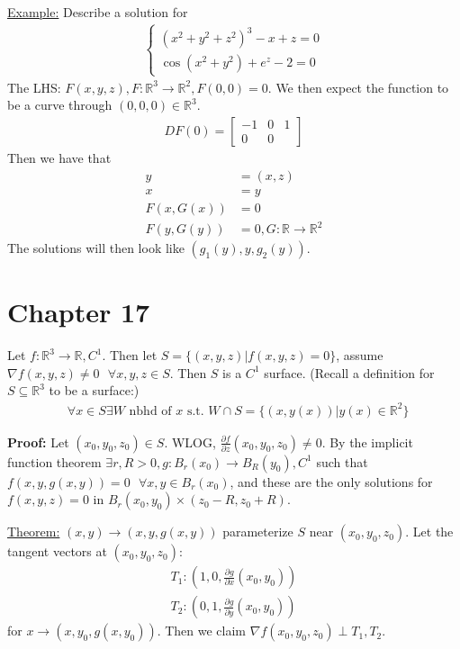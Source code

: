 \documentclass{article}
\newcommand*{\txt}[1]{\text{ #1 }}%
\newcommand*{\fora}{\txt{}\forall}%
\newcommand*{\rr}{\mathbb{R}}%
\newcommand*{\partials}[2]{\frac{\partial #1}{\partial #2}}%
\begin{document}
\underline{Example:} Describe a solution for \begin{align*}
    \begin{cases}
        (x^2+y^2+z^2)^3-x+z=0\\
        \cos(x^2+y^2)+e^z-2=0
    \end{cases}
\end{align*}The LHS: $F(x,y,z), F:\rr^3\to \rr^2, F(0,0)=0$. We then expect the function to be a curve through $(0,0,0)\in \rr^3$. \begin{align*}
    DF(0)=\begin{bmatrix}
        -1 & 0 & 1\\
        0 & 0 & 
    \end{bmatrix}
\end{align*}Then we have that \begin{align*}
    y&=(x,z)\\
    x&=y\\
    F(x,G(x))&=0\\
    F(y,G(y))&=0, G:\rr\to \rr^2
\end{align*}
The solutions will then look like $(g_1(y),y,g_2(y))$. 

\section{Chapter 17}

Let $f:\rr^3\to \rr, C^1$. Then let $S=\{(x,y,z)|f(x,y,z)=0\}$, assume $\nabla f(x,y,z)\neq 0 \fora x,y,z\in S$. Then $S$ is a $C^1$ surface. (Recall a definition for $S\subseteq \rr^3$ to be a surface:)\begin{align*}
    \fora x\in S\exists W\txt{nbhd of}x\txt{s.t.}W\cap S=\{(x,y(x))|y(x)\in \rr^2\}
\end{align*}

\textbf{Proof:} Let $(x_0,y_0,z_0)\in S$. WLOG, $\partials{f}{z}(x_0,y_0,z_0)\neq 0$. By the implicit function theorem $\exists r, R>0, g:B_r(x_0)\to B_R(y_0), C^1$ such that $f(x,y,g(x,y))=0\fora x,y\in B_r(x_0)$, and these are the only solutions for $f(x,y,z)=0$ in $B_r(x_0,y_0)\times (z_0-R,z_0+R)$. 

\underline{Theorem:} $(x,y)\to (x,y,g(x,y))$ parameterize $S$ near $(x_0,y_0,z_0)$. Let the tangent vectors at $(x_0,y_0,z_0)$: \begin{align*}
    T_1:(1,0,\partials{g}{x}(x_0,y_0))\\
    T_2:(0,1,\partials{g}{y}(x_0,y_0))
\end{align*}for $x\to (x,y_0,g(x,y_0))$. Then we claim $\nabla f(x_0,y_0,z_0)\perp T_1, T_2$. 
\end{document}
